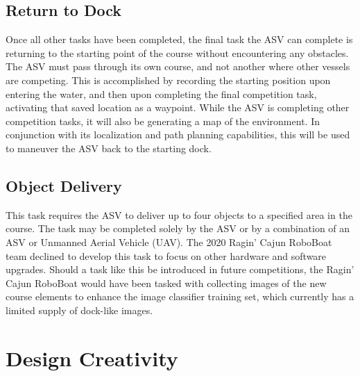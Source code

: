 \documentclass[letterpaper, 12 pt, conference]{ieeeconf}
\begin{document}
\subsection{Return to Dock}
\label{ReturnToDock}
Once all other tasks have been completed, the final task the ASV can complete is returning to the starting point of the course without encountering any obstacles. The ASV must pass through its own course, and not another where other vessels are competing. This is accomplished by recording the starting position upon entering the water, and then upon completing the final competition task, activating that saved location as a waypoint. While the ASV is completing other competition tasks, it will also be generating a map of the environment. In conjunction with its localization and path planning capabilities, this will be used to maneuver the ASV back to the starting dock.

\subsection{Object Delivery}
\label{ObjectDelivery}
This task requires the ASV to deliver up to four objects to a specified area in the course. The task may be completed solely by the ASV or by a combination of an ASV or Unmanned Aerial Vehicle (UAV). The 2020 Ragin' Cajun RoboBoat team declined to develop this task to focus on other hardware and software upgrades. Should a task like this be introduced in future competitions, the Ragin' Cajun RoboBoat would have been tasked with collecting images of the new course elements to enhance the image classifier training set, which currently has a limited supply of dock-like images.

\section{Design Creativity}
\end{document}
